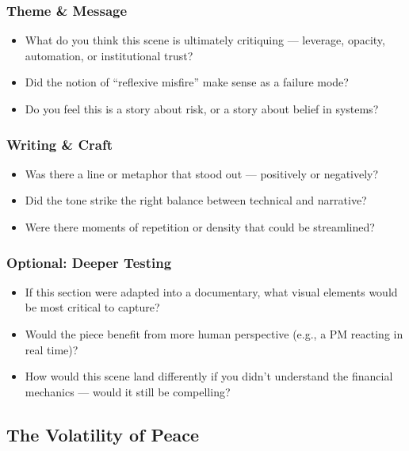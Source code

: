 \subsubsection{Theme \& Message}

\begin{itemize}
  \item What do you think this scene is ultimately critiquing — leverage, opacity, automation, or institutional trust?
  \item Did the notion of ``reflexive misfire'' make sense as a failure mode?
  \item Do you feel this is a story about risk, or a story about belief in systems?
\end{itemize}

\subsubsection{Writing \& Craft}

\begin{itemize}
  \item Was there a line or metaphor that stood out — positively or negatively?
  \item Did the tone strike the right balance between technical and narrative?
  \item Were there moments of repetition or density that could be streamlined?
\end{itemize}

\subsubsection{Optional: Deeper Testing}

\begin{itemize}
  \item If this section were adapted into a documentary, what visual elements would be most critical to capture?
  \item Would the piece benefit from more human perspective (e.g., a PM reacting in real time)?
  \item How would this scene land differently if you didn’t understand the financial mechanics — would it still be compelling?
\end{itemize}





\subsection{The Volatility of Peace}


